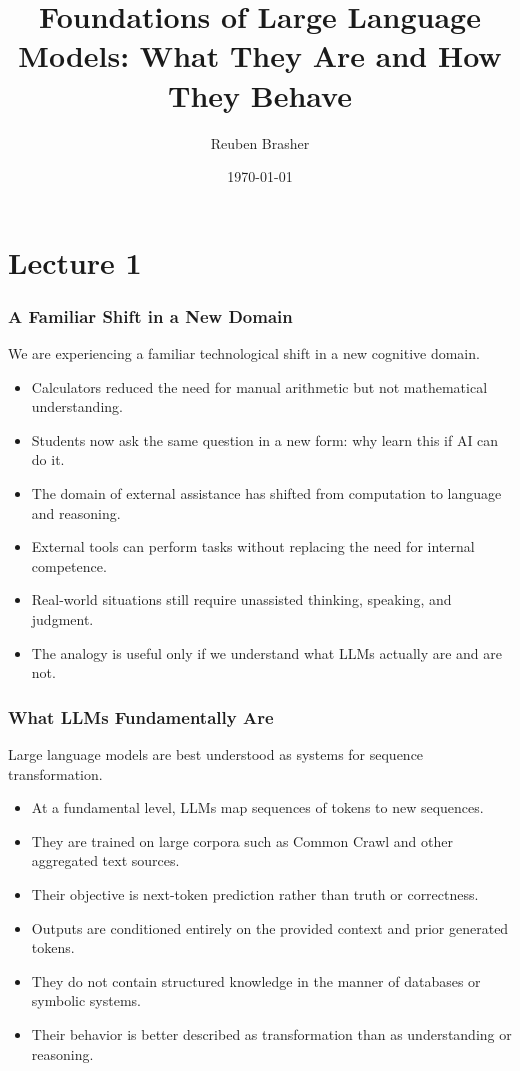 \documentclass{beamer}
\title{Foundations of Large Language Models: What They Are and How They Behave}
\author{Reuben Brasher}
\date{\today}
\begin{document}
\frame{\titlepage}

\section[Outline]{}
\frame{\tableofcontents}

\section{Lecture 1}

\frame
{
   \frametitle{A Familiar Shift in a New Domain}

    We are experiencing a familiar technological shift in a new cognitive domain.

    \begin{itemize}
        \item Calculators reduced the need for manual arithmetic but not mathematical understanding.
        \item Students now ask the same question in a new form: why learn this if AI can do it.
        \item The domain of external assistance has shifted from computation to language and reasoning.
        \item External tools can perform tasks without replacing the need for internal competence.
        \item Real-world situations still require unassisted thinking, speaking, and judgment.
        \item The analogy is useful only if we understand what LLMs actually are and are not.
    \end{itemize}
}

\frame
{
   \frametitle{What LLMs Fundamentally Are}

    Large language models are best understood as systems for sequence transformation.

    \begin{itemize}
        \item At a fundamental level, LLMs map sequences of tokens to new sequences.
        \item They are trained on large corpora such as Common Crawl and other aggregated text sources.
        \item Their objective is next-token prediction rather than truth or correctness.
        \item Outputs are conditioned entirely on the provided context and prior generated tokens.
        \item They do not contain structured knowledge in the manner of databases or symbolic systems.
        \item Their behavior is better described as transformation than as understanding or reasoning.
    \end{itemize}
}
\end{document}
